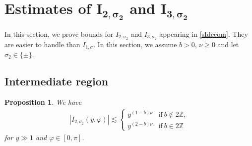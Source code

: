 \documentclass[10pt,a4paper]{amsart}
\numberwithin{equation}{section}
\newtheorem{Proposition}[Theorem]{Proposition}
 { \theoremstyle{definition}
\newtheorem{Definition}[Theorem]{Definition}
\newtheorem{Note}[Theorem]{Note}
\newtheorem{Example}[Theorem]{Example}
\newtheorem{Remark}[Theorem]{Remark} }
\def\f{\varphi}
\def\n{\nu}
\def\s{\sigma}
\begin{document}
\section[Estimates of I\_\{2,s\_2\} and I\_\{3,s\_2\}]{Estimates of $\boldsymbol{I_{2,\s_2}}$ and $\boldsymbol{I_{3,\s_2}}$ }

In this section, we prove bounds for $I_{2,\s_2}$ and $I_{3,\s_2}$ appearing in \eqref{sIdecom}. They are easier to handle than $I_{1,\s}$. In this section, we assume $b>0$, $\n\geq 0$ and let $\s_2\in \{\pm\}$.

\subsection{Intermediate region}

\begin{Proposition}\label{I_2prop}
We have
\begin{align*}
|I_{2,\s_2}(y,\f)|\lesssim \begin{cases}
y^{(1-b)\n}& \text{if}\  b\notin 2\mathbb{Z}, \\
y^{(2-b)\n}& \text{if}\  b\in 2\mathbb{Z}
\end{cases}
\end{align*}
for $y\gg 1$ and $\f\in [0,\pi]$.
\end{Proposition}
\end{document}
